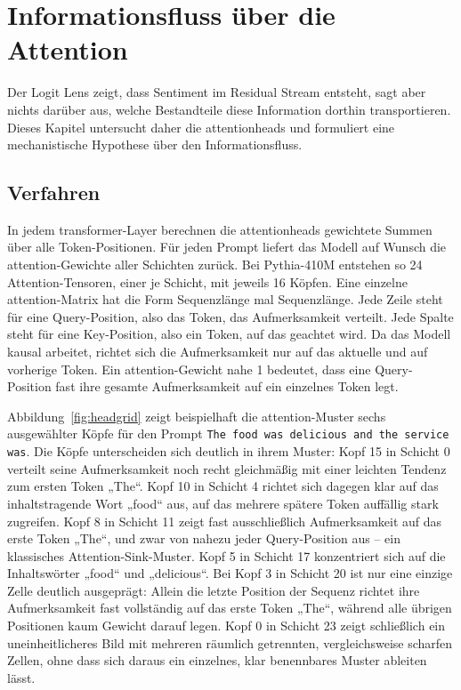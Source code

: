 \section{Informationsfluss über die Attention}

Der Logit Lens zeigt, dass Sentiment im Residual Stream entsteht, sagt aber nichts darüber aus, welche Bestandteile diese Information dorthin transportieren. Dieses Kapitel untersucht daher die \glspl{attentionhead} und formuliert eine mechanistische Hypothese über den Informationsfluss.

\subsection{Verfahren}

In jedem \gls{transformer}-Layer berechnen die \glspl{attentionhead} gewichtete Summen über alle Token-Positionen. Für jeden Prompt liefert das Modell auf Wunsch die \gls{attention}-Gewichte aller Schichten zurück. Bei Pythia-410M entstehen so 24 Attention-Tensoren, einer je Schicht, mit jeweils 16 Köpfen. Eine einzelne \gls{attention}-Matrix hat die Form Sequenzlänge mal Sequenzlänge. Jede Zeile steht für eine Query-Position, also das Token, das Aufmerksamkeit verteilt. Jede Spalte steht für eine Key-Position, also ein Token, auf das geachtet wird. Da das Modell kausal arbeitet, richtet sich die Aufmerksamkeit nur auf das aktuelle und auf vorherige Token. Ein \gls{attention}-Gewicht nahe 1 bedeutet, dass eine Query-Position fast ihre gesamte Aufmerksamkeit auf ein einzelnes Token legt.

Abbildung~\ref{fig:headgrid} zeigt beispielhaft die \gls{attention}-Muster sechs ausgewählter Köpfe für den Prompt \texttt{The food was delicious and the service was}. Die Köpfe unterscheiden sich deutlich in ihrem Muster: Kopf 15 in Schicht 0 verteilt seine Aufmerksamkeit noch recht gleichmäßig mit einer leichten Tendenz zum ersten Token „The“. Kopf 10 in Schicht 4 richtet sich dagegen klar auf das inhaltstragende Wort „food“ aus, auf das mehrere spätere Token auffällig stark zugreifen. Kopf 8 in Schicht 11 zeigt fast ausschließlich Aufmerksamkeit auf das erste Token „The“, und zwar von nahezu jeder Query-Position aus -- ein klassisches Attention-Sink-Muster. Kopf 5 in Schicht 17 konzentriert sich auf die Inhaltswörter „food“ und „delicious“. Bei Kopf 3 in Schicht 20 ist nur eine einzige Zelle deutlich ausgeprägt: Allein die letzte Position der Sequenz richtet ihre Aufmerksamkeit fast vollständig auf das erste Token „The“, während alle übrigen Positionen kaum Gewicht darauf legen. Kopf 0 in Schicht 23 zeigt schließlich ein uneinheitlicheres Bild mit mehreren räumlich getrennten, vergleichsweise scharfen Zellen, ohne dass sich daraus ein einzelnes, klar benennbares Muster ableiten lässt.


